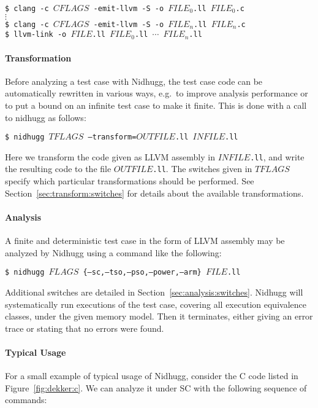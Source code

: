 \documentclass[a4paper]{article}
\begin{document}
\vspace{5pt}
\noindent
\texttt{\$ clang -c $CFLAGS$ -emit-llvm -S -o $FILE_0$.ll $FILE_0$.c}\\
$\vdots$\\
\texttt{\$ clang -c $CFLAGS$ -emit-llvm -S -o $FILE_n$.ll $FILE_n$.c}\\
\texttt{\$ llvm-link -o $FILE$.ll $FILE_0$.ll $\cdots$ $FILE_n$.ll}

\paragraph{Transformation}
%
Before analyzing a test case with Nidhugg, the test case code can be
automatically rewritten in various ways, e.g.\ to improve analysis
performance or to put a bound on an infinite test case to make it
finite. This is done with a call to \textsf{nidhugg} as follows:

\vspace{5pt}
\noindent
\texttt{\$ nidhugg $TFLAGS$ --transform=$OUTFILE$.ll $INFILE$.ll}

\vspace{5pt}\noindent
%
Here we transform the code given as LLVM assembly in
\texttt{$INFILE$.ll}, and write the resulting code to the file
\texttt{$OUTFILE$.ll}. The switches given in $TFLAGS$ specify which
particular transformations should be performed. See
Section~\ref{sec:transform:switches} for details about the available
transformations.

\paragraph{Analysis}
%
A finite and deterministic test case in the form of LLVM assembly may
be analyzed by Nidhugg using a command like the following:

\vspace{5pt}
\noindent
\texttt{\$ nidhugg $FLAGS$ \{--sc,--tso,--pso,--power,--arm\} $FILE$.ll}

\vspace{5pt}\noindent
%
Additional switches are detailed in
Section~\ref{sec:analysis:switches}.
%
Nidhugg will systematically run executions of the test case, covering
all execution equivalence classes, under the given memory model. Then
it terminates, either giving an error trace or stating that no errors
were found.

\paragraph{Typical Usage}
%
For a small example of typical usage of Nidhugg, consider the C code
listed in Figure~\ref{fig:dekker:c}. We can analyze it under SC with
the following sequence of commands:
\end{document}
